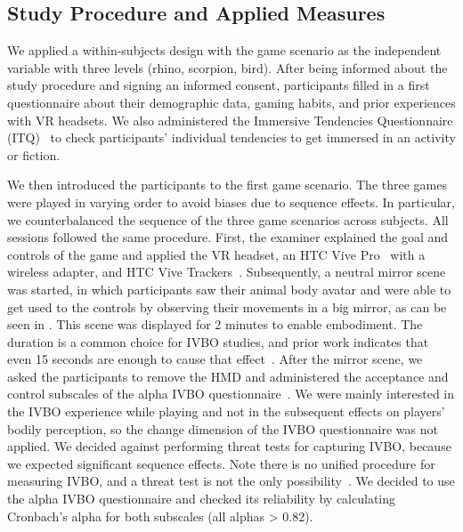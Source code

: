 \documentclass{sigchi}
\begin{document}


\subsection{Study Procedure and Applied Measures}






We applied a within-subjects design with the game scenario as the independent variable with three levels (rhino, scorpion, bird). After being informed about the study procedure and signing an informed consent, participants filled in a first questionnaire about their demographic data, gaming habits, and prior experiences with VR headsets. We also administered the Immersive Tendencies Questionnaire (ITQ)~\cite{witmer1998measuring} to check participants' individual tendencies to get immersed in an activity or fiction. 

We then introduced the participants to the first game scenario. The three games were played in varying order to avoid biases due to sequence effects. In particular, we counterbalanced the sequence of the three game scenarios across subjects. All sessions followed the same procedure. First, the examiner explained the goal and controls of the game and applied the VR headset, an HTC Vive Pro~\cite{vive1} with a wireless adapter, and HTC Vive Trackers~\cite{vive}. Subsequently, a neutral mirror scene was started, in which participants saw their animal body avatar and were able to get used to the controls by observing their movements in a big mirror, as can be seen in . This scene was displayed for 2 minutes to enable embodiment. The duration is a common choice for IVBO studies, and prior work indicates that even 15 seconds are enough to cause that effect~\cite{lloyd2007spatial}. After the mirror scene, we asked the participants to remove the HMD and administered the acceptance and control subscales of the alpha IVBO questionnaire~\cite{roth2017alpha}. We were mainly interested in the IVBO experience while playing and not in the subsequent effects on players' bodily perception, so the change dimension of the IVBO questionnaire was not applied. We decided against performing threat tests for capturing IVBO, because we expected significant sequence effects. Note there is no unified procedure for measuring IVBO, and a threat test is not the only possibility~\cite{kilteni2012sense,roth2017alpha}. We decided to use the alpha IVBO questionnaire and checked its reliability by calculating Cronbach's alpha for both subscales (all alphas > 0.82).
\end{document}
